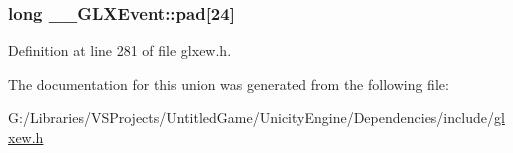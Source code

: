 \subsubsection[{pad}]{\setlength{\rightskip}{0pt plus 5cm}long \+\_\+\+\_\+\+G\+L\+X\+Event\+::pad\mbox{[}24\mbox{]}}\label{union_____g_l_x_event_a1cb8f6e7e77a34d25baf43b3f3bc2d4f}


Definition at line 281 of file glxew.\+h.



The documentation for this union was generated from the following file\+:\begin{DoxyCompactItemize}
\item 
G\+:/\+Libraries/\+V\+S\+Projects/\+Untitled\+Game/\+Unicity\+Engine/\+Dependencies/include/\hyperlink{glxew_8h}{glxew.\+h}\end{DoxyCompactItemize}
